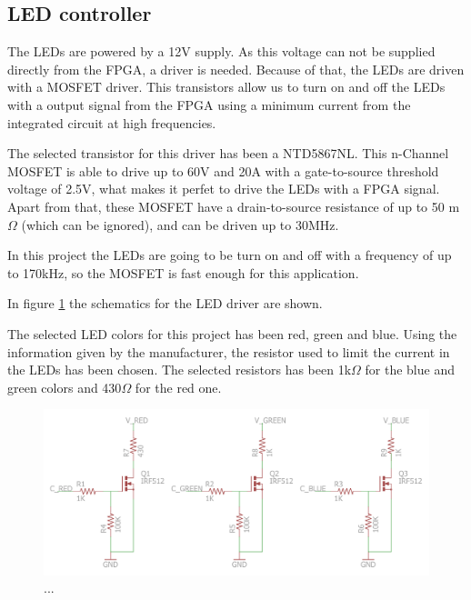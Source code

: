 

\subsection{LED controller}

The LEDs are powered by a 12V supply. As this voltage can not be supplied directly from the FPGA, a driver is needed.
Because of that, the LEDs are driven with a MOSFET driver. This transistors allow us to turn on and off the LEDs with a output signal from the FPGA using a minimum current from the integrated circuit at high frequencies.

The selected transistor for this driver has been a NTD5867NL. This n-Channel MOSFET is able to drive up to 60V and 20A with a gate-to-source threshold voltage of 2.5V, what makes it perfet to drive the LEDs with a FPGA signal.
Apart from that, these MOSFET have a drain-to-source resistance of up to 50 m$\Omega$ (which can be ignored), and can be driven up to 30MHz.

In this project the LEDs are going to be turn on and off with a frequency of up to 170kHz, so the MOSFET is fast enough for this application.

In figure \ref{fig:LED_driver_sch} the schematics for the LED driver are shown.

The selected LED colors for this project has been red, green and blue. Using the information given by the manufacturer, the resistor used to limit the current in the LEDs has been chosen. The selected resistors has been 1k$\Omega$ for the blue and green colors and 430$\Omega$ for the red one.

\begin{figure}[H]
\centering 
\includegraphics[width = 0.4 \textwidth]{images/leddriver_schematics}
\caption{...}
\label{fig:LED_driver_sch}
\end{figure}